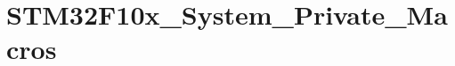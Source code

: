 \hypertarget{group___s_t_m32_f10x___system___private___macros}{\section{S\-T\-M32\-F10x\-\_\-\-System\-\_\-\-Private\-\_\-\-Macros}
\label{group___s_t_m32_f10x___system___private___macros}
}
